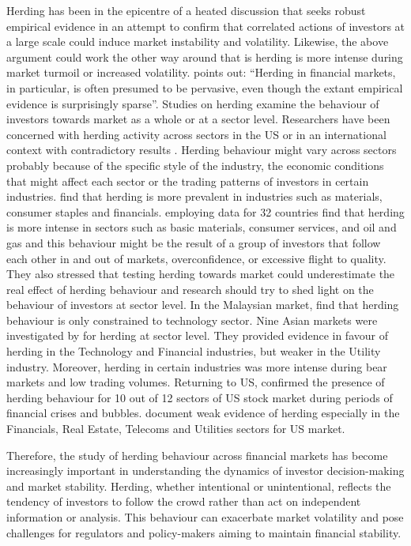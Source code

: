 \documentclass[
  letterpaper,
  DIV=11,
  numbers=noendperiod]{scrartcl}
\begin{document}
Herding has been in the epicentre of a heated discussion that seeks
robust empirical evidence in an attempt to confirm that correlated
actions of investors at a large scale could induce market instability
and volatility. Likewise, the above argument could work the other way
around that is herding is more intense during market turmoil or
increased volatility. \citet{welch2000herding} points out: ``Herding in
financial markets, in particular, is often presumed to be pervasive,
even though the extant empirical evidence is surprisingly sparse''.
Studies on herding examine the behaviour of investors towards market as
a whole or at a sector level. Researchers have been concerned with
herding activity across sectors in the US or in an international context
with contradictory results \citep[see inter
alia][]{christie1995following, choi2009institutional, litimi2016herding}.
Herding behaviour might vary across sectors probably because of the
specific style of the industry, the economic conditions that might
affect each sector or the trading patterns of investors in certain
industries. \citet{henker2006investors} find that herding is more
prevalent in industries such as materials, consumer staples and
financials. \citet{gkebka2013international} employing data for 32
countries find that herding is more intense in sectors such as basic
materials, consumer services, and oil and gas and this behaviour might
be the result of a group of investors that follow each other in and out
of markets, overconfidence, or excessive flight to quality. They also
stressed that testing herding towards market could underestimate the
real effect of herding behaviour and research should try to shed light
on the behaviour of investors at sector level. In the Malaysian market,
\citet{dehghani2014sectoral} find that herding behaviour is only
constrained to technology sector. Nine Asian markets were investigated
by \citet{zheng2017herding} for herding at sector level. They provided
evidence in favour of herding in the Technology and Financial
industries, but weaker in the Utility industry. Moreover, herding in
certain industries was more intense during bear markets and low trading
volumes. Returning to US, \citet{bensaida2017herding} confirmed the
presence of herding behaviour for 10 out of 12 sectors of US stock
market during periods of financial crises and bubbles.
\citet{ukpong2021determinants} document weak evidence of herding
especially in the Financials, Real Estate, Telecoms and Utilities
sectors for US market.

Therefore, the study of herding behaviour across financial markets has
become increasingly important in understanding the dynamics of investor
decision-making and market stability. Herding, whether intentional or
unintentional, reflects the tendency of investors to follow the crowd
rather than act on independent information or analysis. This behaviour
can exacerbate market volatility and pose challenges for regulators and
policy-makers aiming to maintain financial stability.
\end{document}

